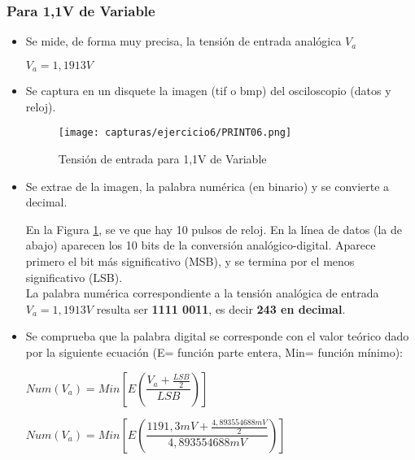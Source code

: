 	\subsubsection{Para 1,1V de Variable}
		\begin{itemize}
			\item Se mide, de forma muy precisa, la tensión de entrada analógica $ V_{a} $
			
			$ V_{a} = 1,1913 V$
			\item Se captura en un disquete la imagen (tif o bmp) del osciloscopio (datos y reloj).
			\begin{figure}[H] %
				\centering
				\texttt{[image: capturas/ejercicio6/PRINT06.png]} 
				\caption{Tensión de entrada para 1,1V de Variable}
				\label{fig:practica6-2}
			\end{figure}
			\item Se extrae de la imagen, la palabra numérica (en binario) y se convierte a decimal.
			
			En la Figura  \ref{fig:practica6-2}, se ve que hay 10 pulsos de reloj. En la línea de datos (la de abajo) aparecen los 10 bits de la conversión
			analógico-digital. Aparece primero el bit más significativo (MSB), y se termina por el menos significativo (LSB).\\
			
			La palabra numérica
			correspondiente a la tensión analógica de entrada $ V_{a} = 1,1913 V$ resulta ser \textbf{1111 0011}, es decir \textbf{243 en decimal}.
			
			\item Se comprueba que la palabra digital se corresponde con el valor teórico dado por la siguiente
			ecuación (E= función parte entera, Min= función mínimo):
			
			\begin{center}
				$ Num(V_{a}) = Min [E(\dfrac{V_{a} + \frac{LSB}{2}}{LSB})]$
			\end{center}
			
			$ Num(V_{a}) = Min [E(\dfrac{1191,3mV + \frac{4,893554688mV}{2}}{4,893554688mV})] $ \hspace{3pt} {\fboxrule=1pt \fboxsep=6pt
				}			
		\end{itemize}
	
